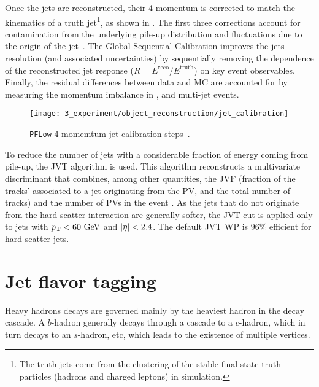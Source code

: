 Once the jets are reconstructed, their 4-momentum is corrected to match the kinematics of a truth jet\footnote{The truth jets come from the \antikt clustering of the stable final state truth particles (hadrons and charged leptons) in simulation.}, as shown in \Fig{\ref{fig:objects:jets:jet_calib:jet_calib_sequence}}. The first three corrections account for contamination from the underlying pile-up distribution and fluctuations due to the origin of the jet~\cite{ATLAS-Jet-Calibration-Run2}. The Global Sequential Calibration improves the jets \pt resolution (and associated uncertainties) by sequentially removing the dependence of the reconstructed jet response (\(R= E^{\text{reco}} / E^{\text{truth}}\)) on key event observables. Finally, the residual differences between data and \ac{MC} are accounted for by
measuring the momentum imbalance in \Zjets, \gammajet and multi-jet events.

\begin{figure}[ht!]
    \centering
    \texttt{[image: 3\_experiment/object\_reconstruction/jet\_calibration]}
    \caption{\texttt{PFLow} 4-momemtum jet calibration steps~\cite{ATLAS-Jet-Calibration-Run2}.}
    \label{fig:objects:jets:jet_calib:jet_calib_sequence}
\end{figure}

To reduce the number of jets with a considerable fraction of energy coming from pile-up, the \ac{JVT} algorithm is used. This algorithm  reconstructs a multivariate discriminant that combines, among other quantities, the \ac{JVF} (fraction of the tracks' \pt associated to a jet originating from the \ac{PV}, and the total number of tracks) and the number of \acp{PV} in the event \Npv. As the jets that do not originate from the hard-scatter interaction are generally softer, the \ac{JVT} cut is applied only to jets with \(p_{\text{T}}<60~\text{GeV}\) and \(|\eta|<2.4\). The default \ac{JVT} \ac{WP} is \(96\%\) efficient for hard-scatter jets.
















\section{Jet flavor tagging}
\label{sec:objects:ftag}

Heavy hadrons decays are governed mainly by the heaviest hadron in the decay cascade. A \(b\)-hadron generally decays through a cascade to a \(c\)-hadron, which in turn decays to an \(s\)-hadron, etc, which leads to the existence of multiple vertices.

